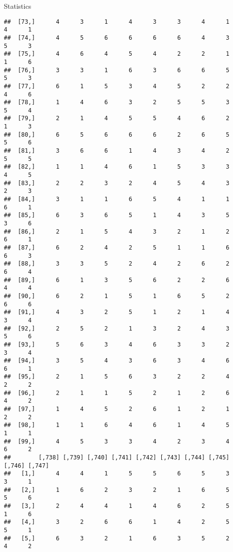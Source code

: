 \documentclass[
  ignorenonframetext,
]{beamer}
\begin{document}
\begin{frame}[fragile]{Statistics}
\begin{verbatim}
##  [73,]      4      3      1      4      3      3      4      1      4      1
##  [74,]      4      5      6      6      6      6      4      3      5      3
##  [75,]      4      6      4      5      4      2      2      1      1      6
##  [76,]      3      3      1      6      3      6      6      5      5      3
##  [77,]      6      1      5      3      4      5      2      2      4      6
##  [78,]      1      4      6      3      2      5      5      3      5      4
##  [79,]      2      1      4      5      5      4      6      2      1      3
##  [80,]      6      5      6      6      6      2      6      5      5      6
##  [81,]      3      6      6      1      4      3      4      2      5      5
##  [82,]      1      1      4      6      1      5      3      3      4      5
##  [83,]      2      2      3      2      4      5      4      3      2      3
##  [84,]      3      1      1      6      5      4      1      1      6      1
##  [85,]      6      3      6      5      1      4      3      5      3      6
##  [86,]      2      1      5      4      3      2      1      2      6      1
##  [87,]      6      2      4      2      5      1      1      6      6      3
##  [88,]      3      3      5      2      4      2      6      2      6      4
##  [89,]      6      1      3      5      6      2      2      6      4      4
##  [90,]      6      2      1      5      1      6      5      2      6      6
##  [91,]      4      3      2      5      1      2      1      4      3      4
##  [92,]      2      5      2      1      3      2      4      3      5      6
##  [93,]      5      6      3      4      6      3      3      2      3      4
##  [94,]      3      5      4      3      6      3      4      6      6      1
##  [95,]      2      1      5      6      3      2      2      4      2      2
##  [96,]      2      1      1      5      2      1      2      6      4      2
##  [97,]      1      4      5      2      6      1      2      1      2      2
##  [98,]      1      1      6      4      6      1      4      5      1      1
##  [99,]      4      5      3      3      4      2      3      4      6      2
##        [,738] [,739] [,740] [,741] [,742] [,743] [,744] [,745] [,746] [,747]
##   [1,]      4      4      1      5      5      6      5      3      3      1
##   [2,]      1      6      2      3      2      1      6      5      5      6
##   [3,]      2      4      4      1      4      6      2      5      1      6
##   [4,]      3      2      6      6      1      4      2      5      5      1
##   [5,]      6      3      2      1      6      3      5      2      4      2

\end{verbatim}
\end{frame}
\end{document}

